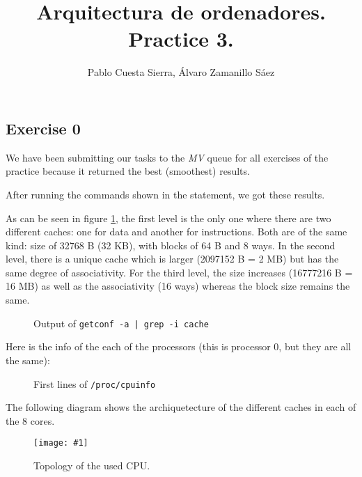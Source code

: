 \documentclass{article}
\newcommand{\myFigure}[4]{%
    \begin{figure}[!ht]
        \texttt{[image: \#1]}
        \centering
        \caption{#2}
        \label{#3}
    \end{figure}
}
\begin{document}
\title{Arquitectura de ordenadores. Practice 3.}
\author{Pablo Cuesta Sierra, Álvaro Zamanillo Sáez}
\maketitle

\begin{tcolorbox}
\tableofcontents
\end{tcolorbox}

\subsection*{Exercise 0}

We have been submitting our tasks to the \emph{MV} queue for all exercises of the practice because it returned the best (smoothest) results. 

After running the commands shown in the statement, we got these results. 

As can be seen in figure \ref{cache_conf}, the first level is the only one where there are two different caches: one for data and another for instructions. Both are of the same kind: size of 32768 B (32 KB), with blocks of 64 B and 8 ways. 
In the second level, there is a unique cache which is larger (2097152 B = 2 MB) but has the same degree of associativity. For the third level, the size increases (16777216 B = 16 MB) as well as the associativity (16 ways) whereas the block size remains the same.

\begin{figure}[h]
    
    \centering
    \caption{Output of \texttt{getconf -a | grep -i cache}}
    \label{cache_conf}
\end{figure}

\pagebreak

Here is the info of the each of the processors (this is processor 0, but they are all the same):

\begin{figure}[h]
    
    \centering
    \caption{First lines of \texttt{/proc/cpuinfo}}
    \label{cpuinfo}
\end{figure}

The following diagram shows the archiquetecture of the different caches in each of the 8 cores. 

\myFigure{../material_P3/out0/mv/figure.png}{Topology of the used CPU.}{topology}{0.34}
\end{document}

